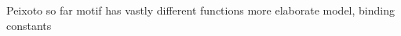 \documentclass[../main.tex]{subfiles}
\begin{document}
Peixoto so far
motif has vastly different functions \cite{Gokhref}
more elaborate model, binding constants	\cite{Gokhref}
\end{document}

